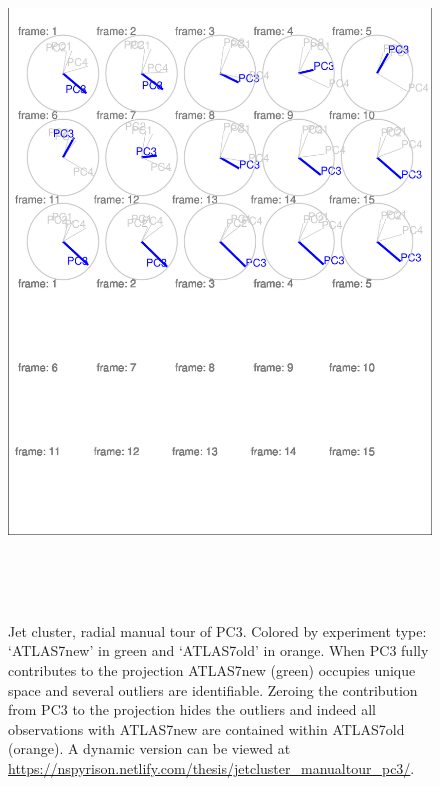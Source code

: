 \documentclass{monashthesis}
\begin{document}
\begin{figure}

{\centering \includegraphics[width=6in,height=7.2in]{thesis_files/figure-latex/JetClusterGood-1} 

}

\caption{Jet cluster, radial manual tour of PC3. Colored
by experiment type: `ATLAS7new' in green and `ATLAS7old' in orange. When
PC3 fully contributes to the projection ATLAS7new (green) occupies
unique space and several outliers are identifiable. Zeroing the
contribution from PC3 to the projection hides the outliers and indeed
all observations with ATLAS7new are contained within ATLAS7old (orange).
A dynamic version can be viewed at
\url{https://nspyrison.netlify.com/thesis/jetcluster_manualtour_pc3/}.}\label{fig:JetClusterGood}
\end{figure}
\end{document}
